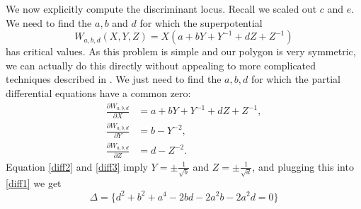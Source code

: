 \documentclass[oneside,reqno]{amsart}
\theoremstyle{definition}
\theoremstyle{definition}
\theoremstyle{definition}
\theoremstyle{definition}
\newcommand{\Fs}{\mathcal{F}}
\begin{document}

We now explicitly compute the discriminant locus. Recall we scaled out $c$ and $e$. We need to find the $a, b$ and $d$ for which the superpotential
$$
W_{a,b,d}(X,Y,Z) = X(a + bY + Y^{-1} +dZ + Z^{-1})
$$
has critical values. As this problem is simple and our polygon is very symmetric, we can actually do this directly without appealing to more complicated techniques described in \cite{gelfand1994discriminants}. We just need to find the $a,b,d$ for which the partial differential equations have a common zero:
\begin{align}
    \frac{\partial W_{a,b,d}}{\partial X} &= a + bY + Y^{-1} +dZ + Z^{-1}, 
    \label{diff1} \\
    \frac{\partial W_{a,b,d}}{\partial Y} &= b-Y^{-2}, 
    \label{diff2}\\
    \frac{\partial W_{a,b,d}}{\partial Z} &= d - Z^{-2}.
    \label{diff3}
\end{align}
Equation \eqref{diff2} and \eqref{diff3} imply $Y = \pm \frac{1}{\sqrt{b}}$ and $Z = \pm \frac{1}{\sqrt{d}}$, and plugging this into \eqref{diff1} we get
\begin{equation}
    \label{discrimexmp1}
    \Delta = \{d^2 + b^2 + a^4 -2bd - 2a^2b - 2a^2d = 0\}
\end{equation}
\end{document}
